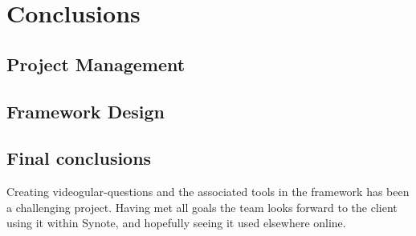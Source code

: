 \chapter{Conclusions} \label{Chapter: Conclusions}



\section{Project Management}



\section{Framework Design}


\section{Final conclusions}

Creating videogular-questions and the associated tools in the framework has been a challenging project. Having met all goals the team looks forward to the client using it within Synote, and hopefully seeing it used elsewhere online. 
